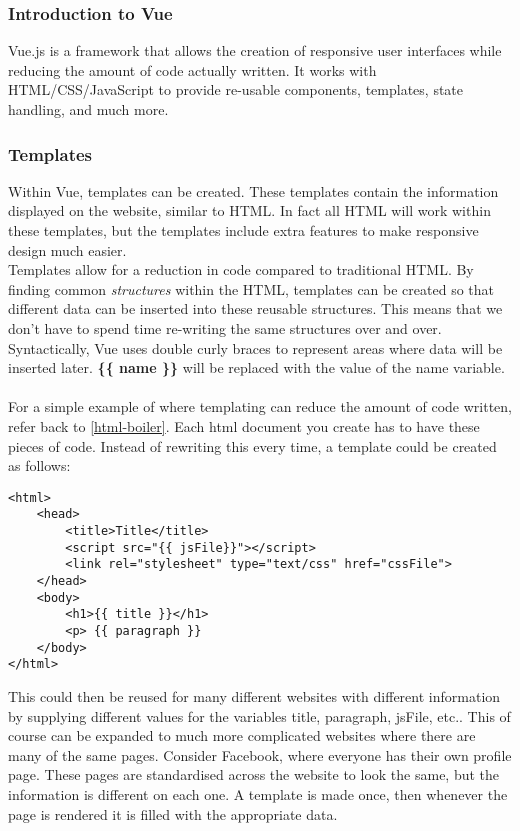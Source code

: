 \documentclass[portfolio.tex]{subfiles}
\begin{document}
				\subsubsection{Introduction to Vue}
					Vue.js is a framework that allows the creation of responsive user interfaces while reducing the amount of code actually written. It works with HTML/CSS/JavaScript to provide re-usable components, templates, state handling, and much more. \autocite{vue}\\

				\subsubsection{Templates}
					Within Vue, templates can be created. These templates contain the information displayed on the website, similar to HTML. In fact all HTML will work within these templates, but the templates include extra features to make responsive design much easier.  \\

					Templates allow for a reduction in code compared to traditional HTML. By finding common \textit{structures} within the HTML, templates can be created so that different data can be inserted into these reusable structures. This means that we don't have to spend time re-writing the same structures over and over. Syntactically, Vue uses double curly braces to represent areas where data will be inserted later. \textbf{\{\{ name \}\}} will be replaced with the value of the name variable.\\ \autocite{vue-template}\\

					For a simple example of where templating can reduce the amount of code written, refer back to \ref{html-boiler}. Each html document you create has to have these pieces of code. Instead of rewriting this every time,  a template could be created as follows:\\

					\begin{lstlisting}
<html>
	<head>
		<title>Title</title>
		<script src="{{ jsFile}}"></script>
		<link rel="stylesheet" type="text/css" href="cssFile">
	</head>
	<body>
		<h1>{{ title }}</h1>
		<p> {{ paragraph }}
	</body>
</html>
					\end{lstlisting}

					\vspace{0.5cm}

					This could then be reused for many different websites with different information by supplying different values for the variables title, paragraph, jsFile, etc.. This of course can be expanded to much more complicated websites where there are many of the same pages. Consider Facebook, where everyone has their own profile page. These pages are standardised across the website to look the same, but the information is different on each one. A template is made once, then whenever the page is rendered it is filled with the appropriate data.\\
\end{document}
